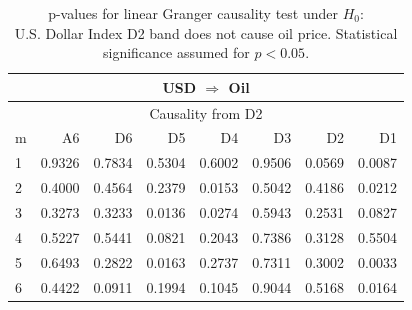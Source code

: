 %
%
\begin{table}[H]
\begin{center}
\begin{tabular}{l|r r r r r r r}
\hline\hline
\multicolumn{8}{c}{USD $\Rightarrow$ Oil}\\
\hline
\multicolumn{8}{c}{Causality from D2}\\
\hline\hline
m & A6 & D6 & D5 & D4 & D3 & D2 & D1 \\
\hline
1 & 0.9326 & 0.7834 & 0.5304 & 0.6002 & 0.9506 & 0.0569 & \cellcolor{mygreen}0.0087 \\
2 & 0.4000 & 0.4564 & 0.2379 & \cellcolor{mygreen}0.0153 & 0.5042 & 0.4186 & \cellcolor{mygreen}0.0212 \\
3 & 0.3273 & 0.3233 & \cellcolor{mygreen}0.0136 & \cellcolor{mygreen}0.0274 & 0.5943 & 0.2531 & 0.0827 \\
4 & 0.5227 & 0.5441 & 0.0821 & 0.2043 & 0.7386 & 0.3128 & 0.5504 \\
5 & 0.6493 & 0.2822 & \cellcolor{mygreen}0.0163 & 0.2737 & 0.7311 & 0.3002 & \cellcolor{mygreen}0.0033 \\
6 & 0.4422 & 0.0911 & 0.1994 & 0.1045 & 0.9044 & 0.5168 & \cellcolor{mygreen}0.0164 \\
\hline\hline
\end{tabular}
\caption{p-values for linear Granger causality test under $H_0$:\\
U.S. Dollar Index D2 band does not cause oil price. Statistical significance assumed for $p<0.05$.}
\end{center}
\end{table}

